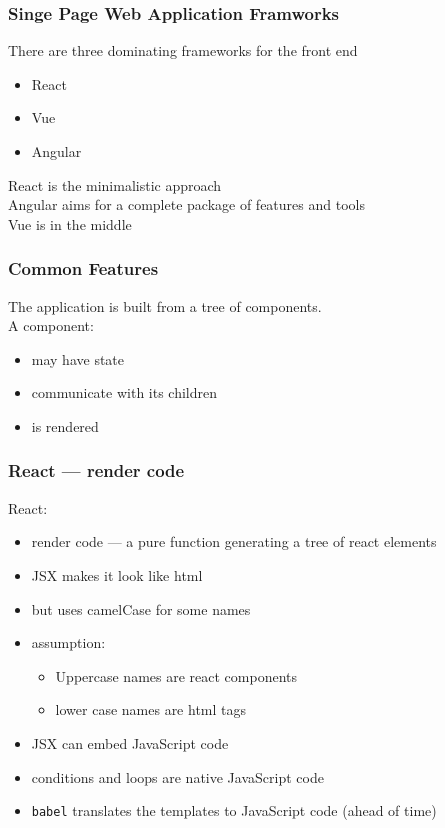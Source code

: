 \begin{frame}[fragile] \frametitle{Singe Page Web Application Framworks}
There are three dominating frameworks for the front end
\begin{itemize}
  \item React
  \item Vue
  \item Angular
\end{itemize}

React is the minimalistic approach
\\Angular aims for a complete package of features and tools
\\Vue is in the middle
\end{frame}

\begin{frame}[fragile] \frametitle{Common Features}

The application is built from a tree of components.
\\A component:
\begin{itemize}
  \item may have state
  \item communicate with its children
  \item is rendered
\end{itemize}
\end{frame}

\begin{frame}[fragile] \frametitle{React --- render code}

React:
\begin{itemize}
  \item render code --- a pure function generating a tree of react elements
  \item JSX makes it look like html
  \item but uses camelCase for some names
  \item assumption:
  \begin{itemize}
    \item Uppercase names are react components
    \item lower case names are html tags
  \end{itemize}
  \item JSX can embed JavaScript code
  \item conditions and loops are native JavaScript code
  \item {\tt babel} translates the templates to JavaScript code (ahead of time)
\end{itemize}
\end{frame}

